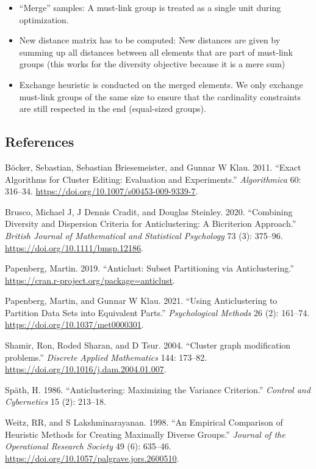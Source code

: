 \documentclass[
]{article}
\providecommand{\tightlist}{%
  \setlength{\itemsep}{0pt}\setlength{\parskip}{0pt}}
\newlength{\cslhangindent}
\newenvironment{CSLReferences}[2] %
 {\begin{list}{}{%
  \setlength{\itemindent}{0pt}
  \setlength{\leftmargin}{0pt}
  \setlength{\parsep}{0pt}
  \ifodd #1
   \setlength{\leftmargin}{\cslhangindent}
   \setlength{\itemindent}{-1\cslhangindent}
  \fi
  \setlength{\itemsep}{#2\baselineskip}}}
 {\end{list}}
\begin{document}
\begin{itemize}
\tightlist
\item
  ``Merge'' samples: A must-link group is treated as a single unit
  during optimization.
\item
  New distance matrix has to be computed: New distances are given by
  summing up all distances between all elements that are part of
  must-link groups (this works for the diversity objective because it is
  a mere sum)
\item
  Exchange heuristic is conducted on the merged elements. We only
  exchange must-link groups of the same size to ensure that the
  cardinality constraints are still respected in the end (equal-sized
  groups).
\end{itemize}

\subsection*{References}\label{references}

\label{refs}
\begin{CSLReferences}{1}{0}
Böcker, Sebastian, Sebastian Briesemeister, and Gunnar W Klau. 2011.
{``Exact Algorithms for Cluster Editing: Evaluation and Experiments.''}
\emph{Algorithmica} 60: 316--34.
\url{https://doi.org/10.1007/s00453-009-9339-7}.

Brusco, Michael J, J Dennis Cradit, and Douglas Steinley. 2020.
{``Combining Diversity and Dispersion Criteria for Anticlustering: A
Bicriterion Approach.''} \emph{British Journal of Mathematical and
Statistical Psychology} 73 (3): 375--96.
\url{https://doi.org/10.1111/bmsp.12186}.

Papenberg, Martin. 2019. {``Anticlust: Subset Partitioning via
Anticlustering.''} \url{https://cran.r-project.org/package=anticlust}.

Papenberg, Martin, and Gunnar W Klau. 2021. {``Using Anticlustering to
Partition Data Sets into Equivalent Parts.''} \emph{Psychological
Methods} 26 (2): 161--74. \url{https://doi.org/10.1037/met0000301}.

Shamir, Ron, Roded Sharan, and D Tsur. 2004. {``{Cluster graph
modification problems}.''} \emph{Discrete Applied Mathematics} 144:
173--82. \url{https://doi.org/10.1016/j.dam.2004.01.007}.

Späth, H. 1986. {``Anticlustering: Maximizing the Variance Criterion.''}
\emph{Control and Cybernetics} 15 (2): 213--18.

Weitz, RR, and S Lakshminarayanan. 1998. {``An Empirical Comparison of
Heuristic Methods for Creating Maximally Diverse Groups.''}
\emph{Journal of the Operational Research Society} 49 (6): 635--46.
\url{https://doi.org/10.1057/palgrave.jors.2600510}.

\end{CSLReferences}
\end{document}
